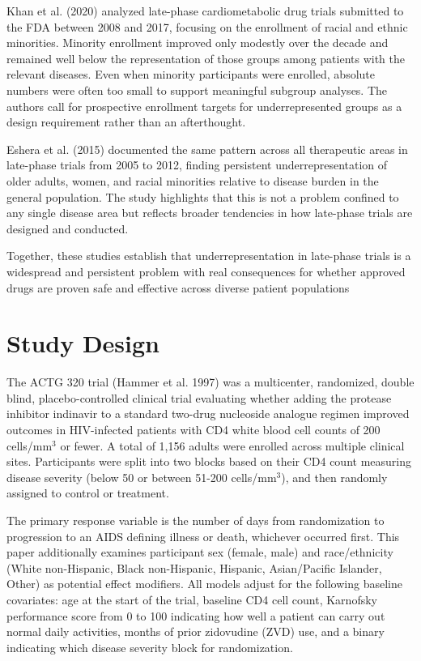 \documentclass[
  letterpaper,
  DIV=11,
  numbers=noendperiod]{scrartcl}
\begin{document}
Khan et al. (2020) analyzed late-phase cardiometabolic drug trials
submitted to the FDA between 2008 and 2017, focusing on the enrollment
of racial and ethnic minorities. Minority enrollment improved only
modestly over the decade and remained well below the representation of
those groups among patients with the relevant diseases. Even when
minority participants were enrolled, absolute numbers were often too
small to support meaningful subgroup analyses. The authors call for
prospective enrollment targets for underrepresented groups as a design
requirement rather than an afterthought.

Eshera et al. (2015) documented the same pattern across all therapeutic
areas in late-phase trials from 2005 to 2012, finding persistent
underrepresentation of older adults, women, and racial minorities
relative to disease burden in the general population. The study
highlights that this is not a problem confined to any single disease
area but reflects broader tendencies in how late-phase trials are
designed and conducted.

Together, these studies establish that underrepresentation in late-phase
trials is a widespread and persistent problem with real consequences for
whether approved drugs are proven safe and effective across diverse
patient populations

\section{Study Design}\label{sec-study-design}

The ACTG 320 trial (Hammer et al. 1997) was a multicenter, randomized,
double blind, placebo-controlled clinical trial evaluating whether
adding the protease inhibitor indinavir to a standard two-drug
nucleoside analogue regimen improved outcomes in HIV-infected patients
with CD4 white blood cell counts of 200 cells/mm\(^3\) or fewer. A total
of 1,156 adults were enrolled across multiple clinical sites.
Participants were split into two blocks based on their CD4 count
measuring disease severity (below 50 or between 51-200 cells/mm\(^3\)),
and then randomly assigned to control or treatment.

The primary response variable is the number of days from randomization
to progression to an AIDS defining illness or death, whichever occurred
first. This paper additionally examines participant sex (female, male)
and race/ethnicity (White non-Hispanic, Black non-Hispanic, Hispanic,
Asian/Pacific Islander, Other) as potential effect modifiers. All models
adjust for the following baseline covariates: age at the start of the
trial, baseline CD4 cell count, Karnofsky performance score from 0 to
100 indicating how well a patient can carry out normal daily activities,
months of prior zidovudine (ZVD) use, and a binary indicating which
disease severity block for randomization.
\end{document}
